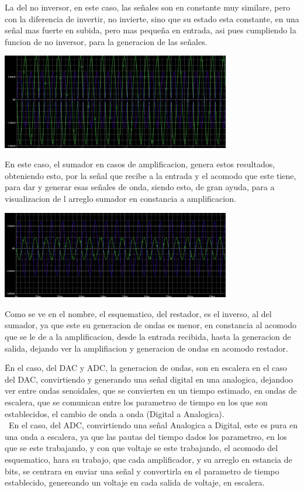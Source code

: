 \documentclass[12pt,a4paper]{article}
\begin{document}
La del no inversor, en este caso, las señales son en constante muy similare, pero con la diferencia de invertir, no invierte, sino que su estado esta constante, en una señal mas fuerte en subida, pero mas pequeña en entrada, asi pues cumpliendo la funcion de no inversor, para la generacion de las señales.

\begin{center}
\includegraphics[width=10cm]{Simulaciones/sumat.png} 
\end{center}

En este caso, el sumador en casos de amplificacion, genera estos resultados, obteniendo esto, por la señal que recibe a la entrada y el acomodo que este tiene, para dar y generar esas señales de onda, siendo esto, de gran ayuda, para a visualizacion de l arreglo sumador en constancia a amplificacion.

\begin{center}
\includegraphics[width=10cm]{Simulaciones/rest.png} 
\end{center}

Como se ve en el nombre, el esquematico, del restador, es el inverso, al del sumador, ya que este su generacion de ondas es menor, en constancia al acomodo que se le de a la amplificacion, desde la entrada recibida, hasta la generacion de salida, dejando ver la amplifiacion y generacion de ondas en acomodo restador.

Ën el caso, del DAC y ADC, la generacion de ondas, son en escalera en el caso del DAC, convirtiendo y generando una señal digital en una analogica, dejandoo ver entre ondas senoidales, que se convierten en un tiempo estimado, en ondas de escalera, que se comunican entre los parametrso de tiempo en los que son establecidos, el cambio de onda a onda (Digital a Analogica).\\\
En el caso, del ADC, convirtiendo una señal Analogica a Digital, este es pura en una onda a escalera, ya que las pautas del tiempo dados los parametrso, en los que se este trabajando, y con que voltaje se este trabajando, el acomodo del esquematico, hara su trabajo, que cada amplificador, y su arreglo en estancia de bits, se centrara en enviar una señal y convertirla en el parametro de tiempo establecido, genereando un voltaje en cada salida de voltaje, en escalera.\\
\end{document}
